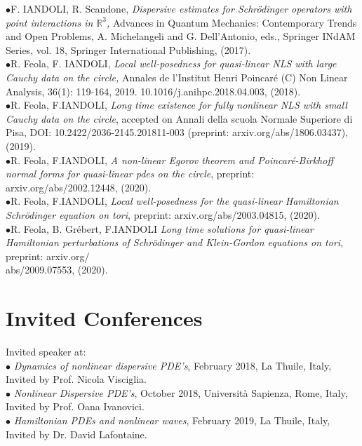 \documentclass[margin,line,pifont,palatino,courier]{res}
\begin{document}
\begin{resume}
$\bullet${\rm{F. IANDOLI, R. Scandone}},  \textit{Dispersive estimates for Schr\"odinger operators with point interactions in $\mathbb{R}^3$,}  Advances in Quantum Mechanics: Contemporary Trends and Open Problems, A. Michelangeli and G. Dell'Antonio, eds., Springer INdAM Series, vol. 18, Springer International Publishing, (2017).\vspace{0.1cm}\\
$\bullet${\rm{R. Feola, F. IANDOLI}},  \textit{Local well-posedness for quasi-linear NLS with large Cauchy data on the circle,}  Annales de l'Institut Henri Poincar\'e (C) Non Linear Analysis, 36(1): 119-164, 2019. 10.1016/j.anihpc.2018.04.003, (2018).\vspace{0.1cm}\\
$\bullet${\rm{R. Feola, F.IANDOLI}}, \textit{Long time existence for fully nonlinear NLS with small Cauchy data on the circle}, accepted on  Annali della scuola Normale Superiore di Pisa, DOI: 10.2422/2036-2145.201811-003 (preprint: arxiv.org/abs/1806.03437), 
(2019).\vspace{0.1cm}\\
$\bullet${\rm{R. Feola, F.IANDOLI}}, \textit{A non-linear Egorov theorem and Poincar\'e-Birkhoff normal forms for quasi-linear pdes on the circle}, preprint: arxiv.org/abs/2002.12448, (2020).\vspace{0.1cm}\\
$\bullet${\rm{R. Feola, F.IANDOLI}}, \textit{Local well-posedness for the quasi-linear Hamiltonian Schr\"odinger equation on tori}, preprint: arxiv.org/abs/2003.04815, (2020).\vspace{0.1cm}\\
$\bullet${\rm{R. Feola, B. Gr\'ebert, F.IANDOLI}} \textit{Long time solutions for quasi-linear Hamiltonian perturbations of Schr\"odinger and Klein-Gordon equations on tori}, preprint: arxiv.org/\\abs/2009.07553, (2020). \vspace{0.1cm}\\



\section{\sc Invited Conferences}

Invited speaker at:\\
 $\bullet$ \emph{Dynamics of nonlinear dispersive PDE's}, February 2018, La Thuile, Italy, Invited by Prof. Nicola Visciglia.\\
$\bullet$  \emph{Nonlinear Dispersive PDE's}, October 2018, Universit\`a Sapienza, Rome, Italy, Invited by Prof. Oana Ivanovici.\\
  $\bullet$ \emph{Hamiltonian PDEs and nonlinear waves}, February 2019, La Thuile, Italy, Invited by Dr. David Lafontaine.\\




\end{resume}
\end{document}
